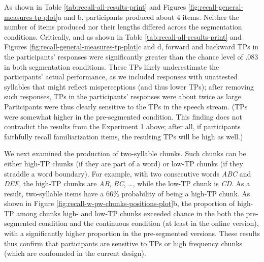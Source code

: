 \documentclass[]{article}
\begin{document}
As shown in Table \ref{tab:recall-all-results-print} and Figures \ref{fig:recall-general-measures-tp-plot}a and b, participants produced about 4 items. Neither the number of items produced nor their lengths differed across the segmentation conditions. Critically, and as shown in Table \ref{tab:recall-all-results-print} and Figures \ref{fig:recall-general-measures-tp-plot}c and d, forward and backward TPs in the participants' responses were significantly greater than the chance level of \(.083\) in both segmentation conditions. These TPs likely underestimate the participants' actual performance, as we included responses with unattested syllables that might reflect misperceptions (and thus lower TPs); after removing such responses, TPs in the participants' responses were about twice as large. Participants were thus clearly sensitive to the TPs in the speech stream. (TPs were somewhat higher in the pre-segmented condition. This finding does not contradict the results from the Experiment 1 above; after all, if participants faithfully recall familiarization items, the resulting TPs will be high as well.)


We next examined the production of two-syllable chunks. Such chunks 
can be either high-TP chunks (if they are part of a word) or low-TP chunks (if they straddle a word boundary). For example, with two consecutive words \emph{ABC} and \emph{DEF}, the high-TP chunks are \emph{AB}, \emph{BC}, \ldots{}, while the low-TP chunk is \emph{CD}. As a result, two-syllable items have a 66\% probability of being a high-TP chunk. As shown in Figure \ref{fig:recall-w-pw-chunks-positions-plot}b, the proportion of high-TP among chunks high- and low-TP chunks exceeded chance in the both the pre-segmented condition and the continuous condition (at least in the online version), with a significantly higher proportion in the pre-segmented versions. These results thus confirm that participants are sensitive to TPs or high frequency chunks (which are confounded in the current design). 

\end{document}
